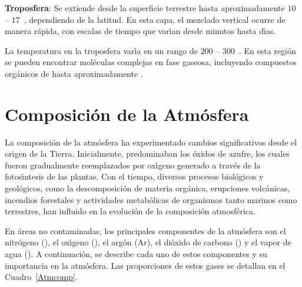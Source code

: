 \textbf{Troposfera}: Se extiende desde la superficie terrestre hasta aproximadamente $10$ -- $17$~\kilo\metre, dependiendo de la latitud. En esta capa, el mezclado vertical ocurre de manera r\'apida, con escalas de tiempo que var\'{\i}an desde minutos hasta d\'{\i}as.  

La temperatura en la troposfera var\'{\i}a en un rango de $200$ -- $300$~\kelvin. En esta regi\'on se pueden encontrar mol\'eculas complejas en fase gaseosa, incluyendo compuestos org\'anicos de hasta aproximadamente .

  \section{Composici\'on de la Atm\'osfera}
   \label{catmos}

La composici\'on de la atm\'osfera ha experimentado cambios significativos desde el origen de la Tierra. Inicialmente, predominaban los \'oxidos de azufre, los cuales fueron gradualmente reemplazados por ox\'{\i}geno generado a trav\'es de la fotos\'{\i}ntesis de las plantas. Con el tiempo, diversos procesos biol\'ogicos y geol\'ogicos, como la descomposici\'on de materia org\'anica, erupciones volc\'anicas, incendios forestales y actividades metab\'olicas de organismos tanto marinos como terrestres, han influido en la evoluci\'on de la composici\'on atmosf\'erica.

En \'areas no contaminadas, los principales componentes de la atm\'osfera son el nitr\'ogeno (), el ox\'{\i}geno (), el arg\'on (Ar), el di\'oxido de carbono () y el vapor de agua (). A continuaci\'on, se describe cada uno de estos componentes y su importancia en la atm\'osfera. Las proporciones de estos gases se detallan en el Cuadro~\ref{Atmcomp}.

